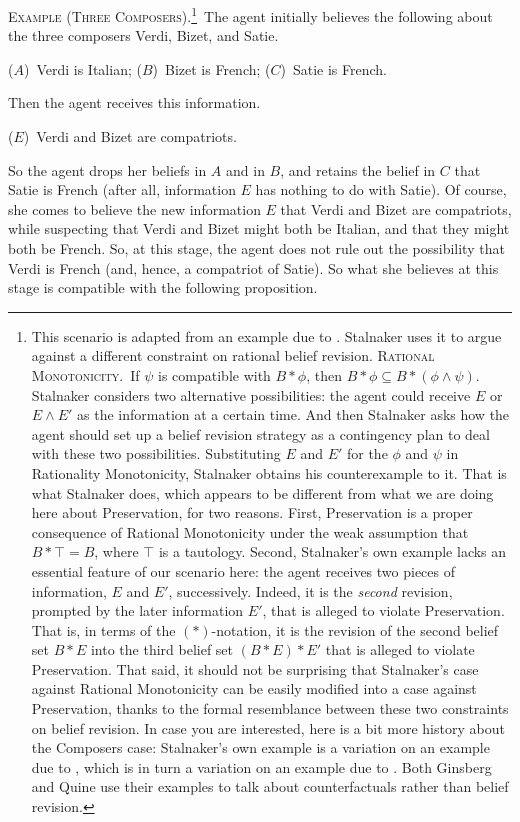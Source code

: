 	\xm \textsc{Example (Three Composers).}\footnote
		{
		This scenario is adapted from an example due to \citet{stalnaker1994nonmonotonic}. Stalnaker uses it to argue against a different constraint on rational belief revision. \op 
			\xm \textsc{Rational Monotonicity.}\, If $\psi$ is compatible with $B * \phi$, then $B * \phi \subseteq B * (\phi \wedge \psi)$. 
		\ed Stalnaker considers two alternative possibilities: the agent could receive $E$ or $E\wedge E'$ as the information at a certain time. And then Stalnaker asks how the agent should set up a belief revision strategy as a contingency plan to deal with these two possibilities. Substituting $E$ and $E'$ for the $\phi$ and $\psi$ in Rationality Monotonicity, Stalnaker obtains his counterexample to it. That is what Stalnaker does, which appears to be different from what we are doing here about Preservation, for two reasons. First, Preservation is a proper consequence of Rational Monotonicity under the weak assumption that $B * \top = B$, where $\top$ is a tautology. Second, Stalnaker's own example lacks an essential feature of our scenario here: the agent receives two pieces of information, $E$ and $E'$, successively. Indeed, it is the {\em second} revision, prompted by the later information $E'$, that is alleged to violate Preservation. That is, in terms of the $(*)$-notation, it is the revision of the second belief set $B * E$ into the third belief set $(B * E) * E'$ that is alleged to violate Preservation.  That said, it should not be surprising that Stalnaker's case against Rational Monotonicity can be easily modified into a case against Preservation, thanks to the formal resemblance between these two constraints on belief revision. In case you are interested, here is a bit more history about the Composers case: Stalnaker's own example is a variation on an example due to \citet{ginsberg1986counterfactuals}, which is in turn a variation on an example due to \citet{quine1982methods}. Both Ginsberg and Quine use their examples to talk about counterfactuals rather than belief revision.
		}\,
	The agent initially believes the following about the three composers Verdi, Bizet, and Satie. \op

		\xm ($A$)\, Verdi is Italian;
		\xm ($B$)\, Bizet is French;
		\xm ($C$)\, Satie is French. 

	\ed Then the agent receives this information. \op

		\xm ($E$)\, Verdi and Bizet are compatriots. 

	\ed So the agent drops her beliefs in $A$ and in $B$, and retains the belief in $C$ that Satie is French (after all, information $E$ has nothing to do with Satie). Of course, she comes to believe the new information $E$ that Verdi and Bizet are compatriots, while suspecting that Verdi and Bizet might both be Italian, and that they might both be French. So, at this stage, the agent does not rule out the possibility that Verdi is French (and, hence, a compatriot of Satie). So what she believes at this stage is compatible with the following proposition. \op

